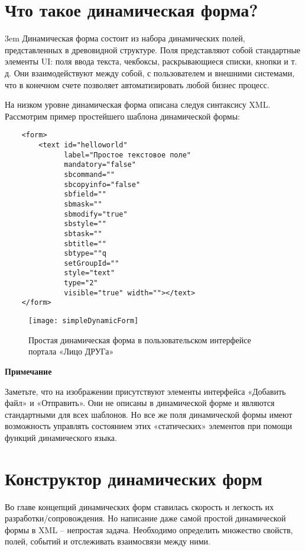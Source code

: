 \documentclass[../index.tex]{subfiles}
\begin{document}
\section{Что такое динамическая форма?}
\emergencystretch 3em
Динамическая форма состоит из набора динамических полей, представленных в древовидной структуре.
Поля представляют собой стандартные элементы UI: поля ввода текста, чекбоксы, раскрывающиеся списки, кнопки и т. д.
Они взаимодействуют между собой, с пользователем и внешними системами,
что в конечном счете позволяет автоматизировать любой бизнес процесс.

На низком уровне динамическая форма описана следуя синтаксису XML.
Рассмотрим пример простейшего шаблона динамической формы:
\begin{verbatim}
    <form>
        <text id="helloworld"
              label="Простое текстовое поле"
              mandatory="false"
              sbcommand=""
              sbcopyinfo="false"
              sbfield=""
              sbmask=""
              sbmodify="true"
              sbstyle=""
              sbtask=""
              sbtitle=""
              sbtype=""q
              setGroupId=""
              style="text"
              type="2"
              visible="true" width=""></text>
    </form>
\end{verbatim}

\begin{figure}[h]
    \texttt{[image: simpleDynamicForm]}
    \centering
    \caption{Простая динамическая форма в пользовательском интерфейсе портала «Лицо ДРУГа»}
\end{figure}

\textbf{Примечание}

Заметьте, что на изображении присутствуют элементы интерфейса «Добавить файл» и «Отправить».
Они не описаны в динамической форме и являются стандартными для всех шаблонов.
Но все же поля динамической формы имеют возможность управлять состоянием этих «статических» элементов
при помощи функций динамического языка.

\section{Конструктор динамических форм}
Во главе концепций динамических форм ставилась скорость и легкость их разработки/сопровождения.
Но написание даже самой простой динамической формы в XML – непростая задача.
Необходимо определить множество свойств, полей, событий и отслеживать взаимосвязи между ними.
\end{document}
